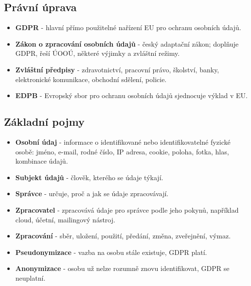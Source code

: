 \subsection*{Právní úprava}
\begin{itemize}
  \item \textbf{GDPR} - hlavní přímo použitelné nařízení EU pro ochranu osobních údajů.
  \item \textbf{Zákon o zpracování osobních údajů} - český adaptační zákon; doplňuje GDPR, řeší ÚOOÚ, některé výjimky a zvláštní režimy.
  \item \textbf{Zvláštní předpisy} - zdravotnictví, pracovní právo, školství, banky, elektronické komunikace, obchodní sdělení, policie.
  \item \textbf{EDPB} - Evropský sbor pro ochranu osobních údajů sjednocuje výklad v EU.
\end{itemize}

\subsection*{Základní pojmy}
\begin{itemize}
  \item \textbf{Osobní údaj} - informace o identifikované nebo identifikovatelné fyzické osobě: jméno, e-mail, rodné číslo, IP adresa, cookie, poloha, fotka, hlas, kombinace údajů.
  \item \textbf{Subjekt údajů} - člověk, kterého se údaje týkají.
  \item \textbf{Správce} - určuje, proč a jak se údaje zpracovávají.
  \item \textbf{Zpracovatel} - zpracovává údaje pro správce podle jeho pokynů, například cloud, účetní, mailingový nástroj.
  \item \textbf{Zpracování} - sběr, uložení, použití, předání, změna, zveřejnění, výmaz.
  \item \textbf{Pseudonymizace} - vazba na osobu stále existuje, GDPR platí.
  \item \textbf{Anonymizace} - osobu už nelze rozumně znovu identifikovat, GDPR se neuplatní.
\end{itemize}

